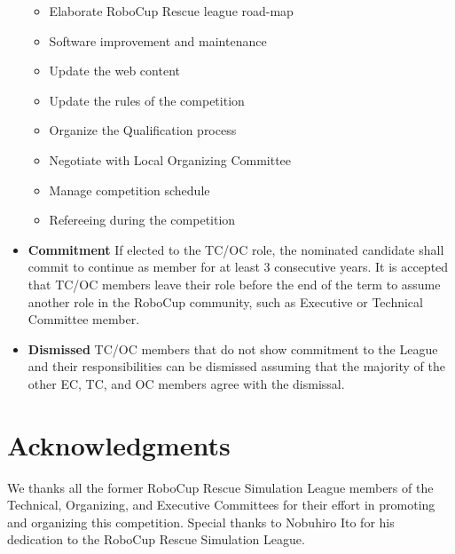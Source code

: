 \documentclass{article}
\begin{document}
\begin{itemize}
  \begin{itemize}
    \item Elaborate RoboCup Rescue league road-map
    \item Software improvement and maintenance
    \item Update the web content
    \item Update the rules of the competition
    \item Organize the Qualification process
    \item Negotiate with Local Organizing Committee
    \item Manage competition schedule
    \item Refereeing during the competition
  \end{itemize}
  \item \textbf{Commitment} If elected to the TC/OC role, the nominated candidate shall commit to continue as member for at least 3 consecutive years. It is accepted that TC/OC members leave their role before the end of the term to assume another role in the RoboCup community, such as Executive or Technical Committee member.
  \item \textbf{Dismissed} TC/OC members that do not show commitment to the League and their responsibilities can be dismissed assuming that the majority of the other EC, TC, and OC members agree with the dismissal.
\end{itemize}
\section*{Acknowledgments}
We thanks all the former RoboCup Rescue Simulation League members of the Technical, Organizing, and Executive Committees for their effort in promoting and organizing this competition. Special thanks to Nobuhiro Ito for his dedication to the RoboCup Rescue Simulation League.
\newpage
\appendix
\end{document}
